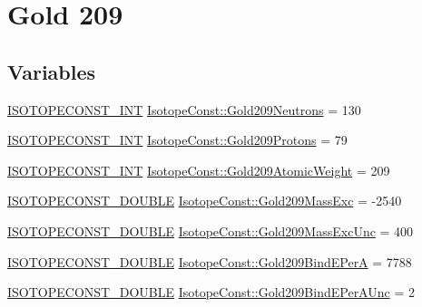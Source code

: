 \hypertarget{group___isotope_const-_gold-_au209}{}\section{Gold 209}
\label{group___isotope_const-_gold-_au209}
\subsection*{Variables}
\begin{DoxyCompactItemize}
\item 
\mbox{\hyperlink{group___isotope_const-_macros_ga5f18360b3e99483a35c32d789e62621c}{I\+S\+O\+T\+O\+P\+E\+C\+O\+N\+S\+T\+\_\+\+I\+NT}} \mbox{\hyperlink{group___isotope_const-_gold-_au209_ga3d40c46a7154aa88e1af3a24727f8c05}{Isotope\+Const\+::\+Gold209\+Neutrons}} = 130
\item 
\mbox{\hyperlink{group___isotope_const-_macros_ga5f18360b3e99483a35c32d789e62621c}{I\+S\+O\+T\+O\+P\+E\+C\+O\+N\+S\+T\+\_\+\+I\+NT}} \mbox{\hyperlink{group___isotope_const-_gold-_au209_gabc8723fa03afbb49f99f7e0a15ce5237}{Isotope\+Const\+::\+Gold209\+Protons}} = 79
\item 
\mbox{\hyperlink{group___isotope_const-_macros_ga5f18360b3e99483a35c32d789e62621c}{I\+S\+O\+T\+O\+P\+E\+C\+O\+N\+S\+T\+\_\+\+I\+NT}} \mbox{\hyperlink{group___isotope_const-_gold-_au209_gad3ab7c712563d0b5909ab38c5e2e0013}{Isotope\+Const\+::\+Gold209\+Atomic\+Weight}} = 209
\item 
\mbox{\hyperlink{group___isotope_const-_macros_ga8f45a7272ce02c0b4c65c44636ed719a}{I\+S\+O\+T\+O\+P\+E\+C\+O\+N\+S\+T\+\_\+\+D\+O\+U\+B\+LE}} \mbox{\hyperlink{group___isotope_const-_gold-_au209_gab4dcfe6e0ab78872da0e11d7d7e1f161}{Isotope\+Const\+::\+Gold209\+Mass\+Exc}} = -\/2540
\item 
\mbox{\hyperlink{group___isotope_const-_macros_ga8f45a7272ce02c0b4c65c44636ed719a}{I\+S\+O\+T\+O\+P\+E\+C\+O\+N\+S\+T\+\_\+\+D\+O\+U\+B\+LE}} \mbox{\hyperlink{group___isotope_const-_gold-_au209_ga6794093678f1a5a0fdeb49865db5996b}{Isotope\+Const\+::\+Gold209\+Mass\+Exc\+Unc}} = 400
\item 
\mbox{\hyperlink{group___isotope_const-_macros_ga8f45a7272ce02c0b4c65c44636ed719a}{I\+S\+O\+T\+O\+P\+E\+C\+O\+N\+S\+T\+\_\+\+D\+O\+U\+B\+LE}} \mbox{\hyperlink{group___isotope_const-_gold-_au209_ga33d0d90f0eafff491f44931f32fb086f}{Isotope\+Const\+::\+Gold209\+Bind\+E\+PerA}} = 7788
\item 
\mbox{\hyperlink{group___isotope_const-_macros_ga8f45a7272ce02c0b4c65c44636ed719a}{I\+S\+O\+T\+O\+P\+E\+C\+O\+N\+S\+T\+\_\+\+D\+O\+U\+B\+LE}} \mbox{\hyperlink{group___isotope_const-_gold-_au209_gae6ea86bbf9c642514acf4ce21062afb3}{Isotope\+Const\+::\+Gold209\+Bind\+E\+Per\+A\+Unc}} = 2

\end{DoxyCompactItemize}
